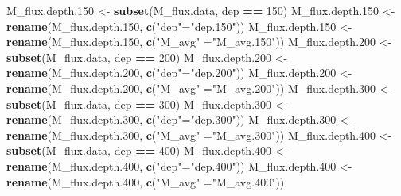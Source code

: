 \documentclass[]{article}
\newenvironment{Shaded}{\begin{snugshade}}{\end{snugshade}}
\newcommand{\DecValTok}[1]{\textcolor[rgb]{0.00,0.00,0.81}{#1}}
\newcommand{\FloatTok}[1]{\textcolor[rgb]{0.00,0.00,0.81}{#1}}
\newcommand{\KeywordTok}[1]{\textcolor[rgb]{0.13,0.29,0.53}{\textbf{#1}}}
\newcommand{\NormalTok}[1]{#1}
\newcommand{\OperatorTok}[1]{\textcolor[rgb]{0.81,0.36,0.00}{\textbf{#1}}}
\newcommand{\StringTok}[1]{\textcolor[rgb]{0.31,0.60,0.02}{#1}}
\begin{document}
\begin{Shaded}
\begin{Highlighting}[]
\NormalTok{M_flux.depth}\FloatTok{.150}\NormalTok{ <-}\StringTok{ }\KeywordTok{subset}\NormalTok{(M_flux.data, dep }\OperatorTok{==}\StringTok{ }\DecValTok{150}\NormalTok{)}
\NormalTok{M_flux.depth}\FloatTok{.150}\NormalTok{ <-}\StringTok{ }\KeywordTok{rename}\NormalTok{(M_flux.depth}\FloatTok{.150}\NormalTok{, }\KeywordTok{c}\NormalTok{(}\StringTok{"dep"}\NormalTok{=}\StringTok{"dep.150"}\NormalTok{))}
\NormalTok{M_flux.depth}\FloatTok{.150}\NormalTok{ <-}\StringTok{ }\KeywordTok{rename}\NormalTok{(M_flux.depth}\FloatTok{.150}\NormalTok{, }\KeywordTok{c}\NormalTok{(}\StringTok{"M_avg"}\NormalTok{ =}\StringTok{"M_avg.150"}\NormalTok{))}
\NormalTok{M_flux.depth}\FloatTok{.200}\NormalTok{ <-}\StringTok{ }\KeywordTok{subset}\NormalTok{(M_flux.data, dep }\OperatorTok{==}\StringTok{ }\DecValTok{200}\NormalTok{)}
\NormalTok{M_flux.depth}\FloatTok{.200}\NormalTok{ <-}\StringTok{ }\KeywordTok{rename}\NormalTok{(M_flux.depth}\FloatTok{.200}\NormalTok{, }\KeywordTok{c}\NormalTok{(}\StringTok{"dep"}\NormalTok{=}\StringTok{"dep.200"}\NormalTok{))}
\NormalTok{M_flux.depth}\FloatTok{.200}\NormalTok{ <-}\StringTok{ }\KeywordTok{rename}\NormalTok{(M_flux.depth}\FloatTok{.200}\NormalTok{, }\KeywordTok{c}\NormalTok{(}\StringTok{"M_avg"}\NormalTok{ =}\StringTok{"M_avg.200"}\NormalTok{))}
\NormalTok{M_flux.depth}\FloatTok{.300}\NormalTok{ <-}\StringTok{ }\KeywordTok{subset}\NormalTok{(M_flux.data, dep }\OperatorTok{==}\StringTok{ }\DecValTok{300}\NormalTok{)}
\NormalTok{M_flux.depth}\FloatTok{.300}\NormalTok{ <-}\StringTok{ }\KeywordTok{rename}\NormalTok{(M_flux.depth}\FloatTok{.300}\NormalTok{, }\KeywordTok{c}\NormalTok{(}\StringTok{"dep"}\NormalTok{=}\StringTok{"dep.300"}\NormalTok{))}
\NormalTok{M_flux.depth}\FloatTok{.300}\NormalTok{ <-}\StringTok{ }\KeywordTok{rename}\NormalTok{(M_flux.depth}\FloatTok{.300}\NormalTok{, }\KeywordTok{c}\NormalTok{(}\StringTok{"M_avg"}\NormalTok{ =}\StringTok{"M_avg.300"}\NormalTok{))}
\NormalTok{M_flux.depth}\FloatTok{.400}\NormalTok{ <-}\StringTok{ }\KeywordTok{subset}\NormalTok{(M_flux.data, dep }\OperatorTok{==}\StringTok{ }\DecValTok{400}\NormalTok{)}
\NormalTok{M_flux.depth}\FloatTok{.400}\NormalTok{ <-}\StringTok{ }\KeywordTok{rename}\NormalTok{(M_flux.depth}\FloatTok{.400}\NormalTok{, }\KeywordTok{c}\NormalTok{(}\StringTok{"dep"}\NormalTok{=}\StringTok{"dep.400"}\NormalTok{))}
\NormalTok{M_flux.depth}\FloatTok{.400}\NormalTok{ <-}\StringTok{ }\KeywordTok{rename}\NormalTok{(M_flux.depth}\FloatTok{.400}\NormalTok{, }\KeywordTok{c}\NormalTok{(}\StringTok{"M_avg"}\NormalTok{ =}\StringTok{"M_avg.400"}\NormalTok{))}
\end{Highlighting}
\end{Shaded}
\end{document}
